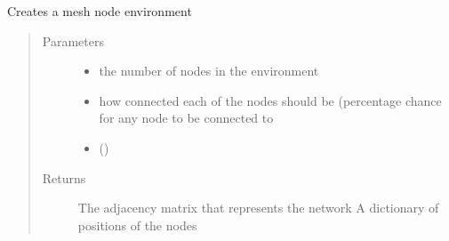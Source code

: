 \documentclass[letterpaper,10pt,english]{sphinxmanual}
\begin{document}
\begin{fulllineitems}
\label{\detokenize{source/yawning_titan.envs.generic.helpers:yawning_titan.envs.generic.helpers.network_creator.create_mesh}}
\sphinxAtStartPar
Creates a mesh node environment
\begin{quote}\begin{description}
\item[{Parameters}] \leavevmode\begin{itemize}
\item {}
\sphinxAtStartPar
{} \textendash{} the number of nodes in the environment

\item {}
\sphinxAtStartPar
{} \textendash{} how connected each of the nodes should be (percentage chance for any node to be connected to

\item {}
\sphinxAtStartPar
{}\sphinxstyleliteralstrong{\sphinxupquote{)}} () \textendash{}

\end{itemize}

\item[{Returns}] \leavevmode
\sphinxAtStartPar
The adjacency matrix that represents the network
A dictionary of positions of the nodes

\end{description}\end{quote}

\end{fulllineitems}
\end{document}
